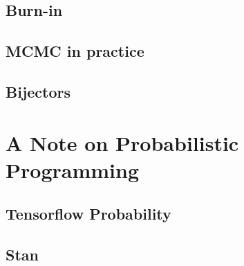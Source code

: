 \subsection{Burn-in}

\subsection{MCMC in practice}

\subsection{Bijectors}

\section{A Note on Probabilistic Programming}
\subsection{Tensorflow Probability}
\subsection{Stan}


